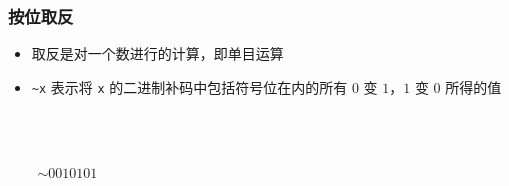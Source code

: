 \begin{frame}[fragile]
    \frametitle{按位取反 ~}

    \begin{itemize}
        \item 取反是对一个数进行的计算，即单目运算
        \item \lstinline|~x| 表示将 \lstinline|x| 的二进制补码中包括符号位在内的所有 $0$ 变 $1$，$1$ 变 $0$ 所得的值
        \begin{columns}
            \quad \\
            \quad \\
             {
                $
                \begin{array}{r}
                    \sim 0010101 \\ \hline
                         \quad
                \end{array}
                $
            }
            
        \end{columns}
    \end{itemize}

\end{frame}

